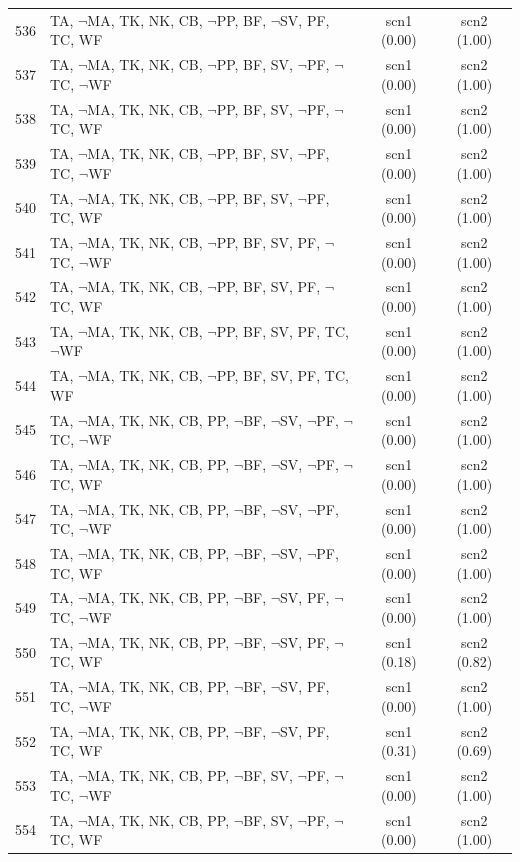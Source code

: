 \documentclass[12pt]{article}
\begin{document}
\begin{longtable}{|l|l|c|c|}
536 & TA, $\neg$MA, TK, NK, CB, $\neg$PP, BF, $\neg$SV, PF, TC, WF & scn1 (0.00) & scn2 (1.00)\\
537 & TA, $\neg$MA, TK, NK, CB, $\neg$PP, BF, SV, $\neg$PF, $\neg$TC, $\neg$WF & scn1 (0.00) & scn2 (1.00)\\
538 & TA, $\neg$MA, TK, NK, CB, $\neg$PP, BF, SV, $\neg$PF, $\neg$TC, WF & scn1 (0.00) & scn2 (1.00)\\
539 & TA, $\neg$MA, TK, NK, CB, $\neg$PP, BF, SV, $\neg$PF, TC, $\neg$WF & scn1 (0.00) & scn2 (1.00)\\
540 & TA, $\neg$MA, TK, NK, CB, $\neg$PP, BF, SV, $\neg$PF, TC, WF & scn1 (0.00) & scn2 (1.00)\\
541 & TA, $\neg$MA, TK, NK, CB, $\neg$PP, BF, SV, PF, $\neg$TC, $\neg$WF & scn1 (0.00) & scn2 (1.00)\\
542 & TA, $\neg$MA, TK, NK, CB, $\neg$PP, BF, SV, PF, $\neg$TC, WF & scn1 (0.00) & scn2 (1.00)\\
543 & TA, $\neg$MA, TK, NK, CB, $\neg$PP, BF, SV, PF, TC, $\neg$WF & scn1 (0.00) & scn2 (1.00)\\
544 & TA, $\neg$MA, TK, NK, CB, $\neg$PP, BF, SV, PF, TC, WF & scn1 (0.00) & scn2 (1.00)\\
545 & TA, $\neg$MA, TK, NK, CB, PP, $\neg$BF, $\neg$SV, $\neg$PF, $\neg$TC, $\neg$WF & scn1 (0.00) & scn2 (1.00)\\
546 & TA, $\neg$MA, TK, NK, CB, PP, $\neg$BF, $\neg$SV, $\neg$PF, $\neg$TC, WF & scn1 (0.00) & scn2 (1.00)\\
547 & TA, $\neg$MA, TK, NK, CB, PP, $\neg$BF, $\neg$SV, $\neg$PF, TC, $\neg$WF & scn1 (0.00) & scn2 (1.00)\\
548 & TA, $\neg$MA, TK, NK, CB, PP, $\neg$BF, $\neg$SV, $\neg$PF, TC, WF & scn1 (0.00) & scn2 (1.00)\\
549 & TA, $\neg$MA, TK, NK, CB, PP, $\neg$BF, $\neg$SV, PF, $\neg$TC, $\neg$WF & scn1 (0.00) & scn2 (1.00)\\
550 & TA, $\neg$MA, TK, NK, CB, PP, $\neg$BF, $\neg$SV, PF, $\neg$TC, WF & scn1 (0.18) & scn2 (0.82)\\
551 & TA, $\neg$MA, TK, NK, CB, PP, $\neg$BF, $\neg$SV, PF, TC, $\neg$WF & scn1 (0.00) & scn2 (1.00)\\
552 & TA, $\neg$MA, TK, NK, CB, PP, $\neg$BF, $\neg$SV, PF, TC, WF & scn1 (0.31) & scn2 (0.69)\\
553 & TA, $\neg$MA, TK, NK, CB, PP, $\neg$BF, SV, $\neg$PF, $\neg$TC, $\neg$WF & scn1 (0.00) & scn2 (1.00)\\
554 & TA, $\neg$MA, TK, NK, CB, PP, $\neg$BF, SV, $\neg$PF, $\neg$TC, WF & scn1 (0.00) & scn2 (1.00)\\

\end{longtable}
\end{document}
